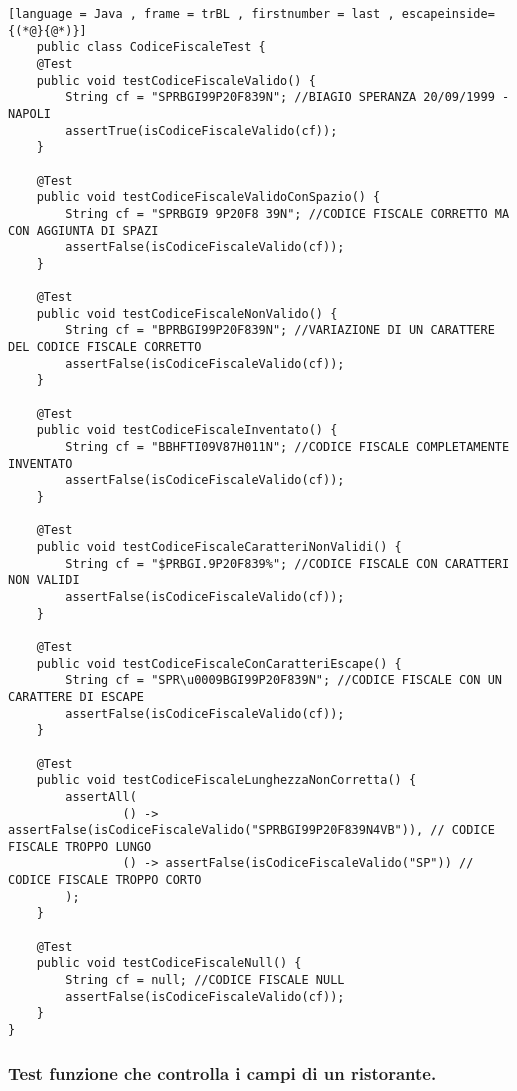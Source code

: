 \begin{lstlisting}[language = Java , frame = trBL , firstnumber = last , escapeinside={(*@}{@*)}]
    public class CodiceFiscaleTest {
    @Test
    public void testCodiceFiscaleValido() {
        String cf = "SPRBGI99P20F839N"; //BIAGIO SPERANZA 20/09/1999 - NAPOLI
        assertTrue(isCodiceFiscaleValido(cf));
    }

    @Test
    public void testCodiceFiscaleValidoConSpazio() {
        String cf = "SPRBGI9 9P20F8 39N"; //CODICE FISCALE CORRETTO MA CON AGGIUNTA DI SPAZI
        assertFalse(isCodiceFiscaleValido(cf));
    }

    @Test
    public void testCodiceFiscaleNonValido() {
        String cf = "BPRBGI99P20F839N"; //VARIAZIONE DI UN CARATTERE DEL CODICE FISCALE CORRETTO
        assertFalse(isCodiceFiscaleValido(cf));
    }

    @Test
    public void testCodiceFiscaleInventato() {
        String cf = "BBHFTI09V87H011N"; //CODICE FISCALE COMPLETAMENTE INVENTATO
        assertFalse(isCodiceFiscaleValido(cf));
    }

    @Test
    public void testCodiceFiscaleCaratteriNonValidi() {
        String cf = "$PRBGI.9P20F839%"; //CODICE FISCALE CON CARATTERI NON VALIDI
        assertFalse(isCodiceFiscaleValido(cf));
    }

    @Test
    public void testCodiceFiscaleConCaratteriEscape() {
        String cf = "SPR\u0009BGI99P20F839N"; //CODICE FISCALE CON UN CARATTERE DI ESCAPE
        assertFalse(isCodiceFiscaleValido(cf));
    }

    @Test
    public void testCodiceFiscaleLunghezzaNonCorretta() {
        assertAll(
                () -> assertFalse(isCodiceFiscaleValido("SPRBGI99P20F839N4VB")), // CODICE FISCALE TROPPO LUNGO
                () -> assertFalse(isCodiceFiscaleValido("SP")) // CODICE FISCALE TROPPO CORTO
        );
    }

    @Test
    public void testCodiceFiscaleNull() {
        String cf = null; //CODICE FISCALE NULL
        assertFalse(isCodiceFiscaleValido(cf));
    }
}

\end{lstlisting}

\subsubsection{Test funzione che controlla i campi di un ristorante.}

